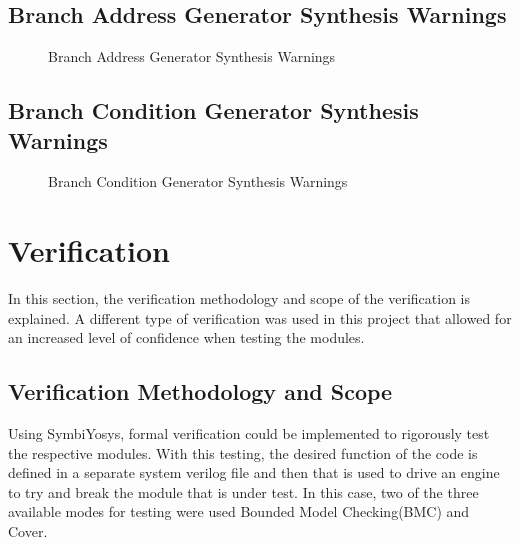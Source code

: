 \documentclass[
    a4paper, %
	12pt, %
    ]{CSSullivanBusinessReport}
\begin{document}
\begin{fullwidth}
\subsection{Branch Address Generator Synthesis Warnings} %
\begin{figure}[H]
    \captionsetup{style=widetable}
    \caption{Branch Address Generator Synthesis Warnings}
    \label{fig:addressWarnings}
\end{figure}

\subsection{Branch Condition Generator Synthesis Warnings} %
\begin{figure}[H]
    \captionsetup{style=widetable}
    \caption{Branch Condition Generator Synthesis Warnings}
    \label{fig:conditionWarnings}
\end{figure}

\section{Verification} %
In this section, the verification methodology and scope of the verification is explained. A different type of verification was used in this project that allowed for an increased level of confidence when testing the modules.  

\subsection{Verification Methodology and Scope}
Using SymbiYosys, formal verification could be implemented to rigorously test the respective modules. With this testing, the desired function of the code is defined in a separate system verilog file and then that is used to drive an engine to try and break the module that is under test. In this case, two of the three available modes for testing were used Bounded Model Checking(BMC) and Cover. 


\end{fullwidth}
\end{document}
